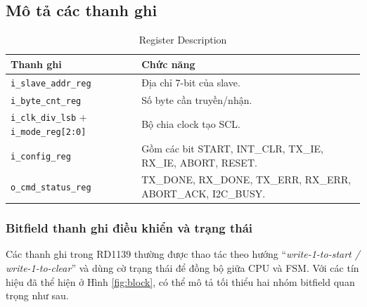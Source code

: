 \subsection{Mô tả các thanh ghi}
\begin{table}[H]
    \centering
    \caption{Register Description}
    \label{tab:reg}
    \begin{tabularx}{\textwidth}{|l|X|}
        \hline
        \textbf{Thanh ghi} & \textbf{Chức năng} \\
        \hline
        \texttt{i\_slave\_addr\_reg} & Địa chỉ 7-bit của slave. \\
        \hline
        \texttt{i\_byte\_cnt\_reg} & Số byte cần truyền/nhận. \\
        \hline
        \texttt{i\_clk\_div\_lsb} + \texttt{i\_mode\_reg[2:0]} & Bộ chia clock tạo SCL. \\
        \hline
        \texttt{i\_config\_reg} & Gồm các bit START, INT\_CLR, TX\_IE, RX\_IE, ABORT, RESET. \\
        \hline
        \texttt{o\_cmd\_status\_reg} & TX\_DONE, RX\_DONE, TX\_ERR, RX\_ERR, ABORT\_ACK, I2C\_BUSY. \\
        \hline
    \end{tabularx}
\end{table}

\subsubsection{Bitfield thanh ghi điều khiển và trạng thái}

Các thanh ghi trong RD1139 thường được thao tác theo hướng ``\emph{write-1-to-start / write-1-to-clear}'' và dùng cờ trạng thái để đồng bộ giữa CPU và FSM. Với các tín hiệu đã thể hiện ở Hình \ref{fig:block}, có thể mô tả tối thiểu hai nhóm bitfield quan trọng như sau.

